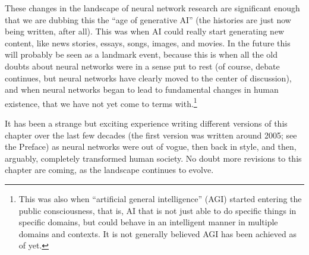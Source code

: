 These changes in the landscape of neural network research are significant enough that we are dubbing this the ``age of generative AI'' (the histories are just now being written, after all). This was when AI could really start generating new content, like news stories, essays, songs, images, and movies. In the future this will probably be seen as a landmark event, because this is when all the old doubts about neural networks were in a sense put to rest (of course, debate continues, but neural networks have clearly moved to the center of discussion), and when neural networks began to lead to fundamental changes in human existence, that we have not yet come to terms with.\footnote{This was also when ``artificial general intelligence'' (AGI) started entering the public consciousness, that is, AI that is not just able to do specific things in specific domains, but could behave in an intelligent manner in multiple domains and contexts. It is not generally believed AGI has been achieved as of yet.}

It has been a strange but exciting experience writing different versions of this chapter over the last few decades (the first version was written around 2005; see the Preface) as neural networks were out of vogue, then back in style, and then, arguably, completely transformed human society. No doubt more revisions to this chapter are coming, as the landscape continues to evolve.
